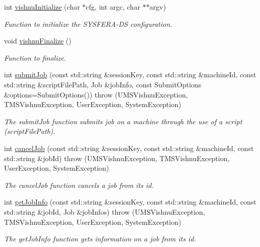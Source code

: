 \begin{DoxyCompactItemize}
int \hyperlink{namespacevishnu_adc7892040980c12dd70ed3228f350313}{vishnuInitialize} (char $\ast$cfg, int argc, char $\ast$$\ast$argv)
\begin{DoxyCompactList}\small\item\em Function to initialize the SYSFERA-\/DS configuration. \item\end{DoxyCompactList}\item 
\hypertarget{namespacevishnu_a5ef439295f52f8055a0771ae9f257b68}{
void \hyperlink{namespacevishnu_a5ef439295f52f8055a0771ae9f257b68}{vishnuFinalize} ()}
\label{namespacevishnu_a5ef439295f52f8055a0771ae9f257b68}

\begin{DoxyCompactList}\small\item\em Function to finalize. \item\end{DoxyCompactList}\item 
int \hyperlink{namespacevishnu_acee6838fcf107a7a9b2f058159b7b9be}{submitJob} (const std::string \&sessionKey, const std::string \&machineId, const std::string \&scriptFilePath, Job \&jobInfo, const SubmitOptions \&options=SubmitOptions())  throw (UMSVishnuException, TMSVishnuException, UserException, SystemException)
\begin{DoxyCompactList}\small\item\em The submitJob function submits job on a machine through the use of a script (scriptFilePath). \item\end{DoxyCompactList}\item 
int \hyperlink{namespacevishnu_a151ba595af88d89107ff08ad0e2c5e31}{cancelJob} (const std::string \&sessionKey, const std::string \&machineId, const std::string \&jobId)  throw (UMSVishnuException, TMSVishnuException, UserException, SystemException)
\begin{DoxyCompactList}\small\item\em The cancelJob function cancels a job from its id. \item\end{DoxyCompactList}\item 
int \hyperlink{namespacevishnu_a4461c3e9d86e9c507436655056a1b660}{getJobInfo} (const std::string \&sessionKey, const std::string \&machineId, const std::string \&jobId, Job \&jobInfos)  throw (UMSVishnuException, TMSVishnuException, UserException, SystemException)
\begin{DoxyCompactList}\small\item\em The getJobInfo function gets information on a job from its id. \item\end{DoxyCompactList}\item 

\end{DoxyCompactItemize}
